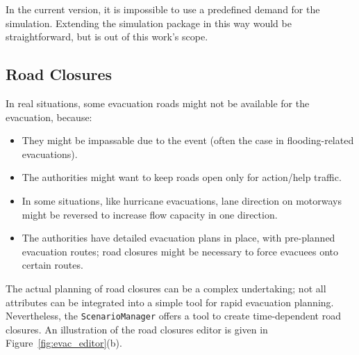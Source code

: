 In the current version, it is impossible to use a predefined demand for the simulation. Extending the simulation package in this way would be straightforward, but is out of this work's scope.

\subsection{Road Closures}
In real situations, some evacuation roads might not be available for the evacuation, because:
\begin{itemize}\styleItemize
\item They might be impassable due to the event (often the case in flooding-related evacuations).
\item The authorities might want to keep roads open only for action/help traffic.
\item In some situations, like hurricane evacuations, lane direction on motorways might be reversed to increase flow capacity in one direction.
\item The authorities have detailed evacuation plans in place, with pre-planned evacuation routes; road closures might be necessary to force evacuees onto certain routes.
\end{itemize}
The actual planning of road closures can be a complex undertaking; not all attributes can be integrated into a simple tool for rapid evacuation planning. Nevertheless, the \lstinline|ScenarioManager| offers a tool to create time-dependent road closures. An illustration of the road closures editor is given in Figure~\ref{fig:evac_editor}(b).

